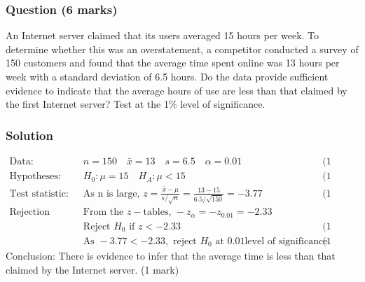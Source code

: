 \documentclass[a4paper,oneside]{book}
\begin{document}
\subsubsection{Question (6 marks)}
An Internet server claimed that its users averaged 15 hours per
week. To determine whether this was an overstatement, a competitor
conducted a survey of 150 customers and found that the average time
spent online was 13 hours per week with a standard deviation of 6.5
hours. Do the data provide sufficient evidence to indicate that the
average hours of use are less than that claimed by the first Internet
server? Test at the 1\% level of significance.

\subsubsection*{Solution}

\begin{align*}
\text{Data: } & n = 150 \quad \bar{x} = 13 \quad s = 6 .5 \quad \alpha
= 0.01 & \text{(1 mark)} \\
\text{Hypotheses: } & H_0 : \mu = 15 \quad H_A: \mu < 15 & \text{(1
  mark)} \\
\text{Test statistic: } & \text{As n is large, } z =
\frac{\bar{x}-\mu}{s/\sqrt{n}} = \frac{13 - 15}{6.5/\sqrt{150}} =
-3.77 & \text{(1 mark)} \\
\text{Rejection region: } &  \text{From the }z-\text{tables, }
-z_{\alpha} = -z_{0.01} = -2.33 & \\
 & \text{Reject } H_0 \text{ if } z < -2.33 & \text{(1 mark)} \\
 & \text{As } -3.77 < -2.33,\text{ reject } H_0 \text{ at } 0.01\text{
   level of significance.} & \text{(1 mark)}
\end{align*}
Conclusion: There is evidence to infer that the average time is less
than that claimed by the Internet server.  (1 mark)
\end{document}
